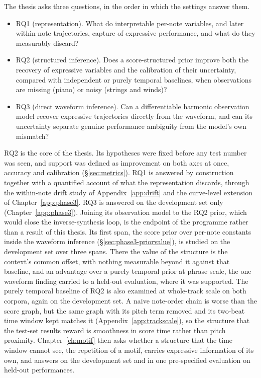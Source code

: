 The thesis asks three questions, in the order in which the settings answer
them.
\begin{itemize}
  \item RQ1 (representation). What do interpretable per-note variables,
        and later within-note trajectories, capture of expressive
        performance, and what do they measurably discard?
  \item RQ2 (structured inference). Does a score-structured prior improve
        both the recovery of expressive variables and the calibration of
        their uncertainty, compared with independent or purely temporal
        baselines, when observations are missing (piano) or noisy (strings
        and winds)?
  \item RQ3 (direct waveform inference). Can a differentiable harmonic
        observation model recover expressive trajectories directly from
        the waveform, and can its uncertainty separate genuine performance
        ambiguity from the model's own mismatch?
\end{itemize}
RQ2 is the core of the thesis. Its hypotheses were fixed before any test
number was seen, and support was defined as improvement on both axes at
once, accuracy and calibration (\S\ref{sec:metrics}). RQ1 is answered by construction together
with a quantified account of what the representation discards, through the
within-note drift study of Appendix~\ref{app:drift} and the curve-level
extension of Chapter~\ref{app:phase3}. RQ3 is answered on the development
set only (Chapter~\ref{app:phase3}). Joining its observation model to the
RQ2 prior, which would close the inverse-synthesis loop, is the endpoint of
the programme rather than a result of this thesis. Its first span, the
score prior over per-note constants inside the waveform inference
(\S\ref{sec:phase3-priorvalue}), is studied on the development set over
three spans. There the value of the structure is the context's common
offset, with nothing measurable beyond it against that baseline, and an
advantage over a purely temporal prior at phrase scale, the one waveform
finding carried to a held-out evaluation, where it was supported. The
purely temporal baseline of RQ2 is also examined at whole-track scale on
both corpora, again on the development set. A naive note-order chain is
worse than the score graph, but the same graph with its pitch term removed
and its two-beat time window kept matches it
(Appendix~\ref{app:trackscale}), so the structure that the test-set results
reward is smoothness in score time rather than pitch proximity.
Chapter~\ref{ch:motif} then asks whether a structure that the time window
cannot see, the repetition of a motif, carries expressive information of
its own, and answers on the development set and in one pre-specified
evaluation on held-out performances.

